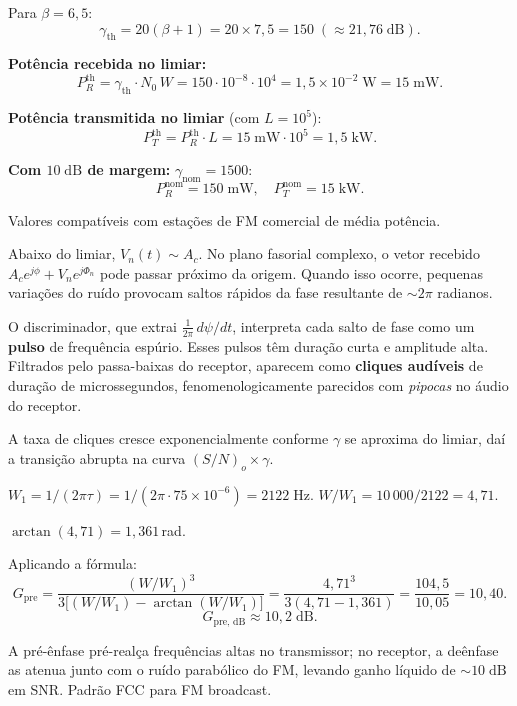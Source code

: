\documentclass[11pt,a4paper]{article}
\begin{document}
\begin{resolucao}

Para $\beta = 6{,}5$:
\[
  \gamma_{\text{th}} = 20(\beta + 1) = 20 \times 7{,}5 = 150 \;(\approx 21{,}76\;\text{dB}).
\]

\textbf{Potência recebida no limiar:}
\[
  P_R^{\text{th}} = \gamma_{\text{th}} \cdot N_0\, W = 150 \cdot 10^{-8} \cdot 10^4 = 1{,}5 \times 10^{-2}\;\text{W} = 15\;\text{mW}.
\]

\textbf{Potência transmitida no limiar} (com $L = 10^5$):
\[
  P_T^{\text{th}} = P_R^{\text{th}}\cdot L = 15\;\text{mW}\cdot 10^5 = 1{,}5\;\text{kW}.
\]

\textbf{Com $10\;\text{dB}$ de margem:} $\gamma_{\text{nom}} = 1500$:
\[
  P_R^{\text{nom}} = 150\;\text{mW}, \quad P_T^{\text{nom}} = 15\;\text{kW}.
\]

Valores compatíveis com estações de FM comercial de média potência.
\end{resolucao}

\begin{resolucao}

Abaixo do limiar, $V_n(t) \sim A_c$. No plano fasorial complexo, o vetor recebido $A_c e^{j\phi} + V_n e^{j\Phi_n}$ pode passar próximo da origem. Quando isso ocorre, pequenas variações do ruído provocam saltos rápidos da fase resultante de $\sim 2\pi$ radianos.

O discriminador, que extrai $\tfrac{1}{2\pi}\,d\psi/dt$, interpreta cada salto de fase como um \textbf{pulso} de frequência espúrio. Esses pulsos têm duração curta e amplitude alta. Filtrados pelo passa-baixas do receptor, aparecem como \textbf{cliques audíveis} de duração de microssegundos, fenomenologicamente parecidos com \emph{pipocas} no áudio do receptor.

A taxa de cliques cresce exponencialmente conforme $\gamma$ se aproxima do limiar, daí a transição abrupta na curva $(S/N)_o\times\gamma$.
\end{resolucao}

\begin{resolucao}

$W_1 = 1/(2\pi\tau) = 1/(2\pi\cdot 75\times 10^{-6}) = 2122\;\text{Hz}$. $W/W_1 = 10\,000/2122 = 4{,}71$.

$\arctan(4{,}71) = 1{,}361$\,rad.

Aplicando a fórmula:
\[
  G_{\text{pre}} = \frac{(W/W_1)^3}{3\big[(W/W_1) - \arctan(W/W_1)\big]}
                = \frac{4{,}71^3}{3(4{,}71 - 1{,}361)}
                = \frac{104{,}5}{10{,}05}
                = 10{,}40.
\]
\[
  \boxed{G_{\text{pre, dB}} \approx 10{,}2\;\text{dB}.}
\]

A pré-ênfase pré-realça frequências altas no transmissor; no receptor, a deênfase as atenua junto com o ruído parabólico do FM, levando ganho líquido de $\sim 10\;\text{dB}$ em SNR. Padrão FCC para FM broadcast.
\end{resolucao}
\end{document}
